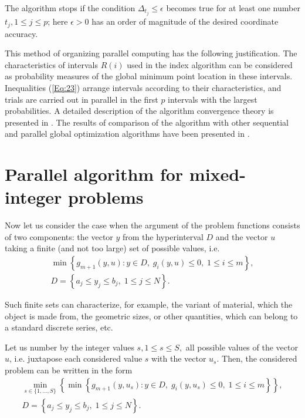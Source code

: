 \documentclass{llncs}
\begin{document}
The algorithm stops if the condition $\Delta_{t_j}\leq \epsilon$ becomes true for at least one 
number $t_j, 1\leq j \leq p$; here  $\epsilon>0$ has an order of magnitude of the desired 
coordinate accuracy.

This method of organizing parallel computing has the following justification.
The characteristics of intervals $R(i)$ used in the index algorithm can be considered as
probability measures of the global minimum point location in these intervals. Inequalities
(\ref{Eq:23}) arrange intervals according to their characteristics, and trials are carried out in parallel in
the first $p$ intervals with the largest probabilities.
A detailed description of the algorithm convergence theory is presented in \cite{Strongin2000}.
The results of comparison of the algorithm with other sequential and parallel global optimization algorithms have been presented in \cite{Sovrasov2019}.

\section{Parallel algorithm for mixed-integer problems}
Now let us consider the case when the argument of the problem functions consists of two 
components: the vector $y$ from the hyperinterval $D$ and the vector $u$ taking a finite 
(and not too large) set of possible values, i.e. 
\begin{gather}\label{problem_i}
\min{\left\{ g_{m+1}(y,u):y\in D, \; g_i(y,u)\leq 0, \; 1 \leq i \leq m\right\}},\\
D=\left\{a_j\leq y_j \leq b_j, \; 1\leq j \leq N \right\}.\nonumber
\end{gather}

Such finite sets can characterize, for example, the variant of material, which the object is made 
from, the geometric sizes, or other quantities, which can belong to a standard discrete series, etc. 

Let us number by the integer values $s, 1\leq s \leq S,$ all possible values of the vector $u$, i.e. 
juxtapose each considered value $s$ with the vector $u_s$. 
Then, the considered problem can be written in the form 
\begin{gather}\label{problem_is}
 \min_{s\in\{1,...,S\}} \left\{ \min_{}{\left\{ g_{m+1}(y,u_s):y\in D, \; g_i(y,u_s)\leq 0, \; 1 \leq i \leq 
m\right\}}\right\},\\
D=\left\{ a_j\leq y_j \leq b_j, \; 1 \leq j\leq N \right\}.\nonumber 
\end{gather}
\end{document}
